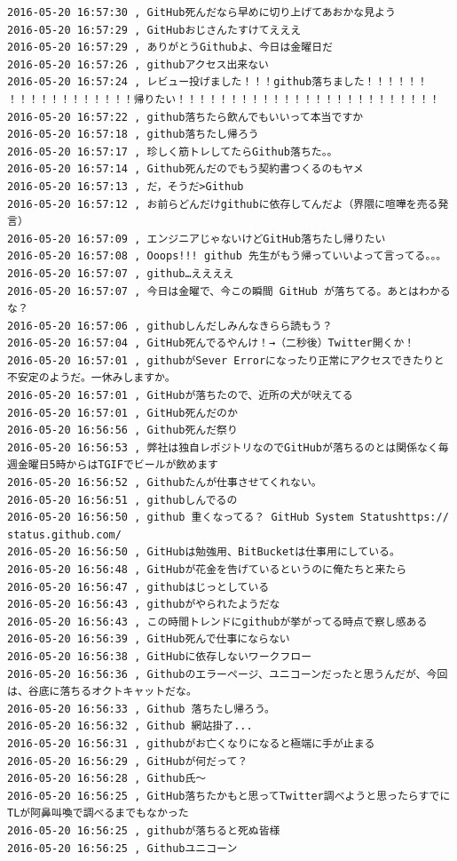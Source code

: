 \begin{verbatim}
2016-05-20 16:57:30 , GitHub死んだなら早めに切り上げてあおかな見よう
2016-05-20 16:57:29 , GitHubおじさんたすけてえええ
2016-05-20 16:57:29 , ありがとうGithubよ、今日は金曜日だ
2016-05-20 16:57:26 , githubアクセス出来ない
2016-05-20 16:57:24 , レビュー投げました！！！github落ちました！！！！！！
！！！！！！！！！！！！帰りたい！！！！！！！！！！！！！！！！！！！！！！！！！
2016-05-20 16:57:22 , github落ちたら飲んでもいいって本当ですか
2016-05-20 16:57:18 , github落ちたし帰ろう
2016-05-20 16:57:17 , 珍しく筋トレしてたらGithub落ちた。。
2016-05-20 16:57:14 , Github死んだのでもう契約書つくるのもヤメ
2016-05-20 16:57:13 , だ，そうだ>Github
2016-05-20 16:57:12 , お前らどんだけgithubに依存してんだよ（界隈に喧嘩を売る発言）
2016-05-20 16:57:09 , エンジニアじゃないけどGitHub落ちたし帰りたい
2016-05-20 16:57:08 , Ooops!!! github 先生がもう帰っていいよって言ってる。。。
2016-05-20 16:57:07 , github…ええええ
2016-05-20 16:57:07 , 今日は金曜で、今この瞬間 GitHub が落ちてる。あとはわかるな？
2016-05-20 16:57:06 , githubしんだしみんなきらら読もう？
2016-05-20 16:57:04 , GitHub死んでるやんけ！→（二秒後）Twitter開くか！
2016-05-20 16:57:01 , githubがSever Errorになったり正常にアクセスできたりと不安定のようだ。一休みしますか。
2016-05-20 16:57:01 , GitHubが落ちたので、近所の犬が吠えてる
2016-05-20 16:57:01 , GitHub死んだのか
2016-05-20 16:56:56 , Github死んだ祭り
2016-05-20 16:56:53 , 弊社は独自レポジトリなのでGitHubが落ちるのとは関係なく毎週金曜日5時からはTGIFでビールが飲めます
2016-05-20 16:56:52 , Githubたんが仕事させてくれない。
2016-05-20 16:56:51 , githubしんでるの
2016-05-20 16:56:50 , github 重くなってる？ GitHub System Statushttps://
status.github.com/ 
2016-05-20 16:56:50 , GitHubは勉強用、BitBucketは仕事用にしている。
2016-05-20 16:56:48 , GitHubが花金を告げているというのに俺たちと来たら
2016-05-20 16:56:47 , githubはじっとしている
2016-05-20 16:56:43 , githubがやられたようだな
2016-05-20 16:56:43 , この時間トレンドにgithubが挙がってる時点で察し感ある
2016-05-20 16:56:39 , GitHub死んで仕事にならない
2016-05-20 16:56:38 , GitHubに依存しないワークフロー
2016-05-20 16:56:36 , Githubのエラーページ、ユニコーンだったと思うんだが、今回は、谷底に落ちるオクトキャットだな。
2016-05-20 16:56:33 , Github 落ちたし帰ろう。
2016-05-20 16:56:32 , Github 網站掛了...
2016-05-20 16:56:31 , githubがお亡くなりになると極端に手が止まる
2016-05-20 16:56:29 , GitHubが何だって？
2016-05-20 16:56:28 , Github氏〜
2016-05-20 16:56:25 , GitHub落ちたかもと思ってTwitter調べようと思ったらすでにTLが阿鼻叫喚で調べるまでもなかった
2016-05-20 16:56:25 , githubが落ちると死ぬ皆様
2016-05-20 16:56:25 , Githubユニコーン

\end{verbatim}
